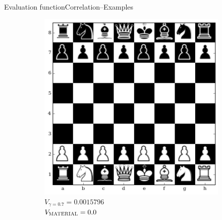 \documentclass[9pt, unknownkeysallowed]{beamer}
\begin{document}
\begin{frame}{Evaluation function}{Correlation--Examples}
\begin{figure}[h]
  \centering
    \begin{subfigure}[t]{0.3\textwidth}
        \centering
        
\includegraphics[width=\textwidth]{../img/table_evaluations/output_35_0.png}
        \centering
        \caption{$V_{\gamma=0.7} = 0.0015796$\\  
$V_{\textsc{MATERIAL}}= 0.0 $}
  \label{figure:correlation2d}
    \end{subfigure}
    ~
    \begin{subfigure}[t]{0.3\textwidth}
        \centering
        

\end{subfigure}
\end{figure}
\end{frame}
\end{document}
